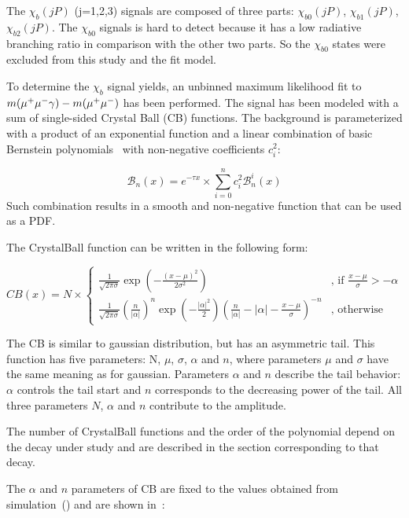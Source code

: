 The $\chi_b(jP)$ (j=1,2,3) signals are composed of three parts: $\chi_{b0}(jP)$,
$\chi_{b1}(jP)$, $\chi_{b2}(jP)$. The $\chi_{b0}$ signals is hard to detect
because it has a low radiative branching ratio in comparison with the other two
parts. So the $\chi_{b0}$ states were excluded from this study and the fit
model.

To determine the $\chi_b$ signal yields, an unbinned maximum likelihood fit to
$m(\mu^+\mu^-\gamma) - m(\mu^+\mu^-)$ has been performed. The signal has been modeled with
a sum of single-sided Crystal Ball (CB)  functions. The background is parameterized with a
product of an exponential function and a linear combination of basic Bernstein
polynomials~\cite{Phillips:2003} with non-negative coefficients $c_{i}^2$:

\begin{equation}
\label{eq:bernstein}
{\mathscr B}_{n}(x) = e^{-\tau x} \times \sum_{i=0}^{n} c_{i}^2 {\mathscr B}_{n}^{i}(x)
\end{equation}
Such combination results in a smooth and non-negative function that can be used
as a PDF.

The CrystalBall function can be written in the following form:

\begin{equation}
CB(x) = N \times
\begin{cases}
\frac{1}{\sqrt{2\pi\sigma}}\exp(-\frac{{(x-\mu)}^2}{2\sigma^2}) & \text{, if $\frac{x-\mu}{\sigma} > -\alpha$} \\
\frac{1}{\sqrt{2\pi\sigma}}{(\frac{n}{|\alpha|})}^n \exp(-\frac{|\alpha|^2}{2}){(\frac{n}{|\alpha|}-|\alpha|-\frac{x-\mu}{\sigma})}^{-n} & \text{, otherwise}
\end{cases}
\label{eq:cb}
\end{equation}

The CB is similar to gaussian distribution, but has an asymmetric tail. This
function has five parameters: N, $\mu$, $\sigma$, $\alpha$ and $n$, where
parameters $\mu$ and $\sigma$ have the same meaning as for gaussian. Parameters
$\alpha$ and $n$ describe the tail behavior: $\alpha$ controls the tail start
and $n$ corresponds to the decreasing power of the tail. All three parameters
$N$, $\alpha$ and $n$ contribute to the amplitude.

The number of CrystalBall functions and the order of the polynomial depend on
the decay under study and are described in the section corresponding to that
decay.


The $\alpha$ and $n$
parameters of CB are fixed to the values obtained from simulation~()
and are shown in~:


